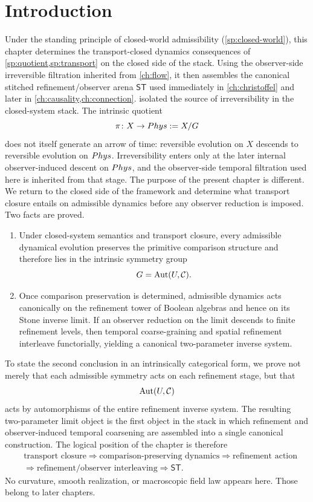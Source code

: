 \section{Introduction}
Under the standing principle of closed-world admissibility
(\cref{sp:closed-world}), this chapter determines the transport-closed
dynamics consequences of \cref{sp:quotient,sp:transport} on the closed
side of the stack.  Using the observer-side irreversible filtration
inherited from \cref{ch:flow}, it then assembles the canonical stitched
refinement/observer arena \(\mathsf{ST}\) used immediately in
\cref{ch:christoffel} and later in \cref{ch:causality,ch:connection}.
 isolated the source of irreversibility in the
closed-system stack.  The intrinsic quotient
\[
	\pi\colon X\to Phys:=X/G
\]
does not itself generate an arrow of time: reversible evolution on \(X\)
descends to reversible evolution on \(Phys\).  Irreversibility enters
only at the later internal observer-induced descent on \(Phys\), and
the observer-side temporal filtration used here is inherited from that
stage.
The purpose of the present chapter is different.  We return to the
closed side of the framework and determine what transport closure entails
on admissible dynamics before any observer reduction is imposed.
Two facts are proved.
\begin{enumerate}[label=\textup{(\roman*)}]
	\item
	      Under closed-system semantics and transport closure, every admissible
	      dynamical evolution preserves the primitive comparison structure and
	      therefore lies in the intrinsic symmetry group
	      \[
		      G=\operatorname{Aut}(U,\mathcal C).
	      \]
	\item
	      Once comparison preservation is determined, admissible dynamics acts
	      canonically on the refinement tower of Boolean algebras and hence on
	      its Stone inverse limit.  If an observer reduction on the limit
	      descends to finite refinement levels, then temporal coarse-graining and
	      spatial refinement interleave functorially, yielding a canonical
	      two-parameter inverse system.
\end{enumerate}
To state the second conclusion in an intrinsically categorical form, we
prove not merely that each admissible symmetry acts on each refinement
stage, but that
\[
	\operatorname{Aut}(U,\mathcal C)
\]
acts by automorphisms of the entire refinement inverse system.
The resulting two-parameter limit object is the first object in the
stack in which refinement and observer-induced temporal coarsening are
assembled into a single canonical construction.
\medskip
The logical position of the chapter is therefore
\[
	\begin{aligned}
		 & \text{transport closure}
		\Longrightarrow
		\text{comparison-preserving dynamics}
		\Longrightarrow
		\text{refinement action}
		\\
		 & \Longrightarrow
		\text{refinement/observer interleaving}
		\Longrightarrow
		\mathsf{ST}.
	\end{aligned}
\]
No curvature, smooth realization, or macroscopic field law appears
here.  Those belong to later chapters.

